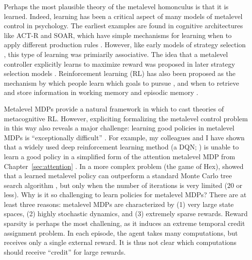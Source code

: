 Perhaps the most plausible theory of the metalevel homonculus is that it is learned. Indeed, learning has been a critical aspect of many models of metalevel control in psychology. The earliest examples are found in cognitive architectures like ACT-R and SOAR, which have simple mechanisms for learning when to apply different production rules \citep{laird1986chunking}. However, like early models of strategy selection \citep{shrager1998scads}, this type of learning was primiarily associative. The idea that a metalevel controller explicitly learns to maximize reward was proposed in later strategy selection models \citet{erev2005adaptation,rieskamp2006ssl,lieder2017strategy}. Reinforcement learning (RL) has also been proposed as the mechanism by which people learn which goals to pursue \citep{cushman2015habitual}, and when to retrieve and store information in working memory \citep{oreilly2006making,todd2008learning} and episodic memory \citep{lu2022neural}. 

Metalevel MDPs provide a natural framework in which to cast theories of metacognitive RL. However, expliciting formalizing the metalevel control problem in this way also reveals a major challenge: learning good policies in metalevel MDPs is ``exceptionally difficult'' \citep{hay2016principles}. For example, my colleagues and I have shown that a widely used deep reinforcement learning method (a DQN; \citealp{mnih2015humanlevel}) is unable to learn a good policy in a simplified form of the attention metalevel MDP from Chapter~\ref{sec:attention} \citep{callaway2018learning}. In a more complex problem (the game of Hex), \citet{hay2016principles} showed that a learned metalevel policy can outperform a standard Monte Carlo tree search algorithm \citep{kocsis2006bandit}, but only when the number of iterations is very limited (20 or less). Why is it so challenging to learn policies for metalevel MDPs? There are at least three reasons: metalevel MDPs are characterized by (1) very large state spaces, (2) highly stochastic dynamics, and (3) extremely sparse rewards. Reward sparsity is perhaps the most challening, as it induces an extreme temporal credit assignment problem. In each episode, the agent takes many computations, but receives only a single external reward. It is thus not clear which computations should receive ``credit'' for large rewards. 

